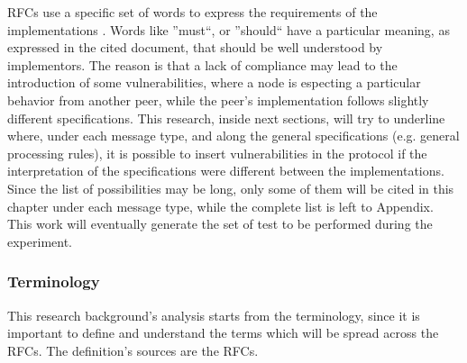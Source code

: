\documentclass[12pt]{article}
\begin{document}
RFCs use a specific set of words to express the requirements of the implementations \cite{rfc2119}. Words like ''must``, or ''should`` have a particular meaning, as expressed in the cited document, that should be well 
understood by implementors. The reason is that a lack of compliance may lead to the introduction of some vulnerabilities, where a node is especting a particular behavior from another peer, while the peer's implementation 
follows slightly different specifications. This research, inside next sections, will try to underline where, under each message type, and along the general specifications (e.g. general processing rules), it is possible 
to insert vulnerabilities in the protocol if the interpretation of the specifications were different between the implementations.\\
Since the list of possibilities may be long, only some of them will be cited in this chapter under each message type, while the complete list is left to Appendix. This work will eventually generate the set of test to be 
performed during the experiment.


\subsubsection{Terminology}
\label{subsub:terminology}

This research background's analysis starts from the terminology, since it is important to define and understand the terms which will be spread across the RFCs. The definition's sources are the RFCs.
\end{document}
